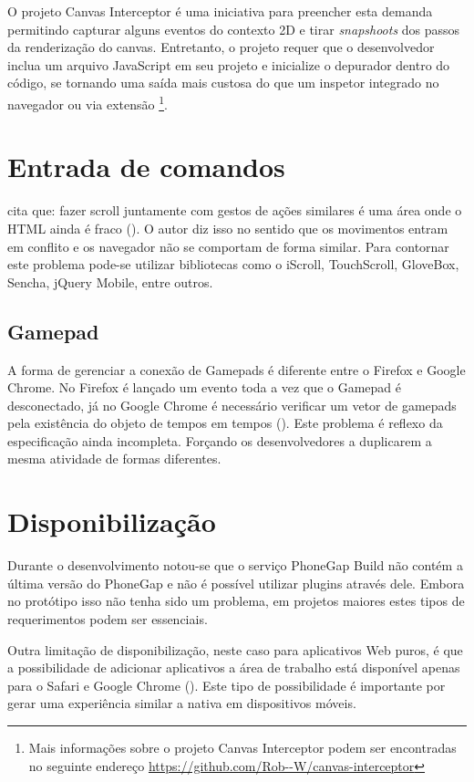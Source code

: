O projeto Canvas Interceptor é uma iniciativa para preencher
esta demanda permitindo capturar alguns eventos do contexto 2D e
tirar \textit{snapshoots} dos passos da renderização do canvas.
Entretanto, o projeto requer que o desenvolvedor inclua um arquivo
JavaScript em seu projeto e inicialize o depurador dentro do código,
se tornando uma saída mais custosa do que um inspetor integrado
no navegador ou via extensão \footnote{Mais informações sobre o
projeto Canvas Interceptor podem ser encontradas no seguinte endereço
\url{https://github.com/Rob--W/canvas-interceptor}}.

\section{Entrada de comandos}

\citet[p. 9]{aSeriousContender} cita que: fazer scroll juntamente
com gestos de ações similares é uma área onde o HTML ainda é
fraco (). O autor diz isso no sentido que os
movimentos entram em conflito e os navegador não se comportam de forma
similar. Para contornar este problema pode-se utilizar bibliotecas como
o iScroll, TouchScroll, GloveBox, Sencha, jQuery Mobile, entre outros.

\subsection{Gamepad}

A forma de gerenciar a conexão de Gamepads é diferente entre o Firefox
e Google Chrome. No Firefox é lançado um evento toda a vez que o
Gamepad é desconectado, já no Google Chrome é necessário verificar
um vetor de gamepads pela existência do objeto de tempos em tempos
\autocite{gamepad} (). Este problema é
reflexo da especificação ainda incompleta. Forçando os desenvolvedores
a duplicarem a mesma atividade de formas diferentes.

\section{Disponibilização}

Durante o desenvolvimento notou-se que o serviço PhoneGap Build não
contém a última versão do PhoneGap e não é possível utilizar
plugins através dele. Embora no protótipo isso não tenha sido um
problema, em projetos maiores estes tipos de requerimentos podem ser
essenciais.

Outra limitação de disponibilização, neste caso para aplicativos
Web puros, é que a possibilidade de adicionar aplicativos a área
de trabalho está disponível apenas para o Safari e Google Chrome
(). Este tipo de possibilidade é importante por
gerar uma experiência similar a nativa em dispositivos móveis.

